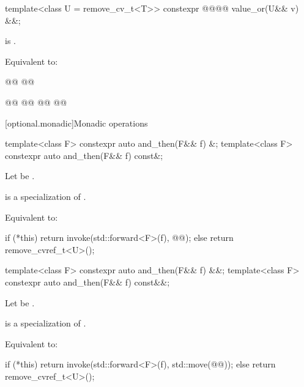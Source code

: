 %
\begin{itemdecl}
template<class U = remove_cv_t<T>>
  constexpr @@@@ value_or(U&& v) &&;
\end{itemdecl}

\begin{itemdescr}
\pnum
\mandates
{} is  .

\pnum
\effects
Equivalent to:
\begin{codeblock}
@@
@@

@@
  @@
@\added{\}}@
@@
\end{codeblock}
\end{itemdescr}

[optional.monadic]{Monadic operations}

%
\begin{itemdecl}
template<class F>
  constexpr auto and_then(F&& f) &;
template<class F>
  constexpr auto and_then(F&& f) const&;
\end{itemdecl}

\begin{itemdescr}
\pnum
Let  be .

\pnum
\mandates
{} is a specialization of .

\pnum
\effects
Equivalent to:
\begin{codeblock}
if (*this) {
  return invoke(std::forward<F>(f), @@);
} else {
  return remove_cvref_t<U>();
}
\end{codeblock}
\end{itemdescr}

%
\begin{itemdecl}
template<class F>
  constexpr auto and_then(F&& f) &&;
template<class F>
  constexpr auto and_then(F&& f) const&&;
\end{itemdecl}

\begin{itemdescr}
\pnum
Let  be .

\pnum
\mandates
{} is a specialization of .

\pnum
\effects
Equivalent to:
\begin{codeblock}
if (*this) {
  return invoke(std::forward<F>(f), std::move(@@));
} else {
  return remove_cvref_t<U>();
}
\end{codeblock}
\end{itemdescr}

